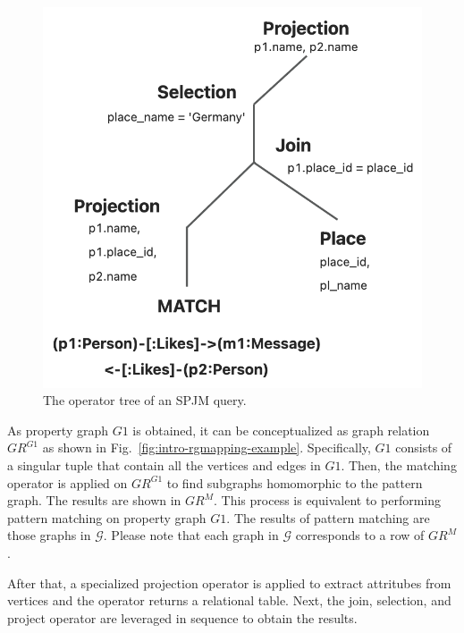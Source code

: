 \begin{figure}
    \centering
    \includegraphics[width=.6\linewidth]{./figures/spjm.png}
    \caption{The operator tree of an SPJM query.}
    \label{fig:spjm}
\end{figure}

\begin{example}

    As property graph \(G1\) is obtained, it can be conceptualized as graph relation \(GR^{G1}\) as shown in Fig.~\ref{fig:intro-rgmapping-example}.
    Specifically, \(G1\) consists of a singular tuple that contain all the vertices and edges in \(G1\).
    Then, the matching operator is applied on \(GR^{G1}\) to find subgraphs homomorphic to the pattern graph.
    The results are shown in \(GR^M\).
    This process is equivalent to performing pattern matching on property graph $G1$.
    The results of pattern matching are those graphs in \(\mathcal{G}\).
    Please note that each graph in \(\mathcal{G}\) corresponds to a row of \(GR^{M}\).

    After that, a specialized projection operator is applied to extract attritubes from vertices and the operator returns a relational table.
    Next, the join, selection, and project operator are leveraged in sequence to obtain the results.
\end{example}

